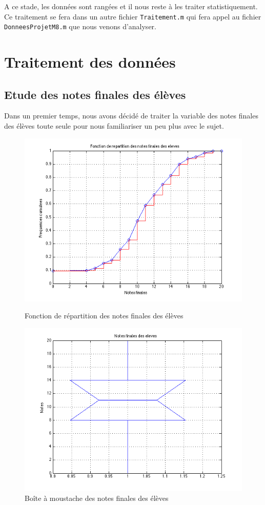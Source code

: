 \documentclass[11pt]{article}
\begin{document}
A ce stade, les données sont rangées et il nous reste à les traiter statistiquement. Ce traitement se fera dans un autre fichier \texttt{Traitement.m} qui fera appel au fichier \texttt{DonneesProjetM8.m} que nous venons d'analyser. 


\newpage
\section{Traitement des données}
\subsection{Etude des notes finales des élèves}

Dans un premier temps, nous avons décidé de traiter la variable des notes finales des élèves toute seule pour nous familiariser un peu plus avec le sujet.

\begin{figure}[h]
\centering
\includegraphics[scale=0.5]{Images/fig1.png}
\caption{Fonction de répartition des notes finales des élèves}

\includegraphics[scale=0.5]{Images/fig2.png}
\caption{Boîte à moustache des notes finales des élèves}
\end{figure}
\end{document}
